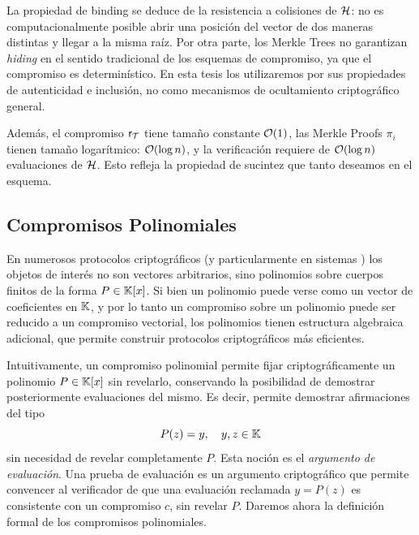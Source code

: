 La propiedad de binding se deduce de la resistencia a colisiones de $\mathcal{H}$: no es computacionalmente posible abrir una posición del vector de dos maneras distintas y llegar a la misma raíz. Por otra parte, los Merkle Trees no garantizan \textit{hiding} en el sentido tradicional de los esquemas de compromiso, ya que el compromiso es determinístico. En esta tesis los utilizaremos por sus propiedades de autenticidad e inclusión, no como mecanismos de ocultamiento criptográfico general.

Además, el compromiso $\mathsf{r}_{\mathcal{T}}$ tiene tamaño constante $\mathcal{O}(1)$, las Merkle Proofs $\pi_i$ tienen tamaño logarítmico: $\mathcal{O}(\log n)$, y la verificación requiere de $\mathcal{O}(\log n)$ evaluaciones de $\mathcal{H}$. Esto refleja la propiedad de sucintez que tanto deseamos en el esquema.

\subsection{Compromisos Polinomiales}
\label{subsec:apendice-b-commitment-schemes-compromisos-polinomiales}

En numerosos protocolos criptográficos (y particularmente en sistemas \SNARK) los objetos de interés no son vectores arbitrarios, sino polinomios sobre cuerpos finitos de la forma $P \in \mathbb{K}[x]$. Si bien un polinomio puede verse como un vector de coeficientes en $\mathbb{K}$, y por lo tanto un compromiso sobre un polinomio puede ser reducido a un compromiso vectorial, los polinomios tienen estructura algebraica adicional, que permite construir protocolos criptográficos más eficientes.

Intuitivamente, un compromiso polinomial permite fijar criptográficamente un polinomio $P \in \mathbb{K}[x]$ sin revelarlo, conservando la posibilidad de demostrar posteriormente evaluaciones del mismo. Es decir, permite demostrar afirmaciones del tipo
$$P(z) = y, \quad y,z \in \mathbb{K}$$
sin necesidad de revelar completamente $P$. Esta noción es el \emph{argumento de evaluación}. Una prueba de evaluación es un argumento criptográfico que permite convencer al verificador de que una evaluación reclamada $y = P(z)$ es consistente con un compromiso $c$, sin revelar $P$. Daremos ahora la definición formal de los compromisos polinomiales.

